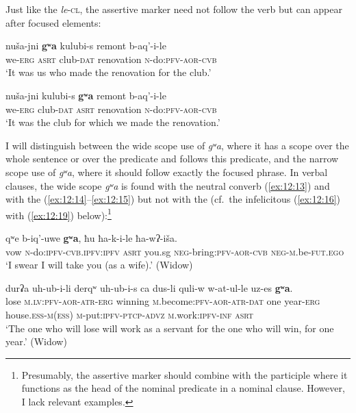 ﻿\documentclass[output=paper]{langsci/langscibook}
\begin{document}
Just like the  \emph{le}-\textsc{cl}, the assertive marker need not follow
the verb but can appear after focused elements:

\ea \label{ex:12:12} %
\ea %
\gll nuša-jni \textbf{gʷa} kulubi-s remont b-aq'-i-le\\
we-\textsc{erg} \textsc{asrt} club-\textsc{dat} renovation \textsc{n}-do:\textsc{pfv}-\textsc{aor}-\textsc{cvb}\\
\glt `It was us who made the renovation for the club.'

\ex %
\gll nuša-jni kulubi-s \textbf{gʷa} remont b-aq'-i-le\\
we-\textsc{erg} club-\textsc{dat} \textsc{asrt} renovation \textsc{n}-do:\textsc{pfv}-\textsc{aor}-\textsc{cvb}\\
\glt `It was the club for which we made the renovation.'
\z
\z

I will distinguish between the wide scope use of \emph{gʷa}, where it
has a scope over the whole sentence or over the predicate and follows
this predicate, and the narrow scope use of \emph{gʷa}, where it should
follow exactly the focused phrase. In verbal clauses, the wide scope
\emph{gʷa} is found with the {neutral converb} (\ref{ex:12:13}) and with the
 (\ref{ex:12:14}–\ref{ex:12:15}) but not with the  (cf.\ the
infelicitous (\ref{ex:12:16}) with (\ref{ex:12:19}) below):\footnote{Presumably, the assertive marker should
  combine with the participle where it functions as the head of the
  nominal predicate in a nominal clause. However, I lack relevant
  examples.}

\ea \label{ex:12:13} %
\gll qʷe b-iq'-uwe \textbf{gʷa}, ħu ħa-k-i-le ħa-wʔ-iša.\\
vow \textsc{n}-do:\textsc{ipfv}-\textsc{cvb.ipfv}:\textsc{ipfv} \textsc{asrt} you.sg \textsc{neg}-bring:\textsc{pfv}-\textsc{aor}-\textsc{cvb} \textsc{neg}-\textsc{m}.be-\textsc{fut}.\textsc{ego}\\
\glt `I swear I will take you (as a wife).' (Widow)

\ex \label{ex:12:14} %
\gll durʡa uh-ub-i-li derqʷ uh-ub-i-s ca dus-li quli-w w-at-ul-le uz-es \textbf{gʷa}.\\ 
lose \textsc{m}.\textsc{lv}:\textsc{pfv}-\textsc{aor}-\textsc{atr}-\textsc{erg} winning \textsc{m}.become:\textsc{pfv}-\textsc{aor}-\textsc{atr}-\textsc{dat}
one year-\textsc{erg} house.\textsc{ess}-\textsc{m}(\textsc{ess}) \textsc{m}-put:\textsc{ipfv}-\textsc{ptcp}-\textsc{advz} \textsc{m}.work:\textsc{ipfv}-\textsc{inf} \textsc{asrt}\\
\glt `The one who will lose will work as a servant for the one who will win,
for one year.' (Widow)
\end{document}
